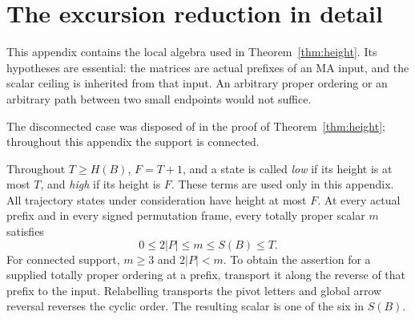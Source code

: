 \section{The excursion reduction in detail}\label{app:excursion}
This appendix contains the local algebra used in Theorem~\ref{thm:height}. Its hypotheses are essential: the matrices are actual prefixes of an MA input, and the scalar ceiling is inherited from that input. An arbitrary proper ordering or an arbitrary path between two small endpoints would not suffice.

The disconnected case was disposed of in the proof of Theorem~\ref{thm:height}; throughout this appendix the support is connected.

Throughout $T\ge H(B)$, $F=T+1$, and a state is called \emph{low} if its height is at most $T$, and \emph{high} if its height is $F$. These terms are used only in this appendix. All trajectory states under consideration have height at most $F$. At every actual prefix and in every signed permutation frame, every totally proper scalar $m$ satisfies
\begin{equation}\label{eq:prefixscalar}
 0\le 2|P|\le m\le S(B)\le T.
\end{equation}
For connected support, $m\ge3$ and $2|P|<m$. To obtain the assertion for a supplied totally proper ordering at a prefix, transport it along the reverse of that prefix to the input. Relabelling transports the pivot letters and global arrow reversal reverses the cyclic order. The resulting scalar is one of the six in $S(B)$.

